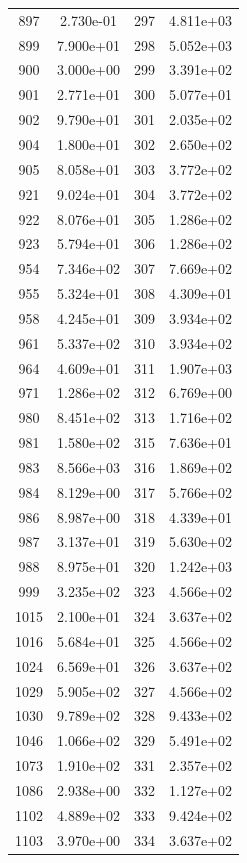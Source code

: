 \documentclass[12pt]{article}
\begin{document}
\begin{longtable}{@{}cccc@{}}
897 & 2.730e-01 & 297 & 4.811e+03 \\
899 & 7.900e+01 & 298 & 5.052e+03 \\
900 & 3.000e+00 & 299 & 3.391e+02 \\
901 & 2.771e+01 & 300 & 5.077e+01 \\
902 & 9.790e+01 & 301 & 2.035e+02 \\
904 & 1.800e+01 & 302 & 2.650e+02 \\
905 & 8.058e+01 & 303 & 3.772e+02 \\
921 & 9.024e+01 & 304 & 3.772e+02 \\
922 & 8.076e+01 & 305 & 1.286e+02 \\
923 & 5.794e+01 & 306 & 1.286e+02 \\
954 & 7.346e+02 & 307 & 7.669e+02 \\
955 & 5.324e+01 & 308 & 4.309e+01 \\
958 & 4.245e+01 & 309 & 3.934e+02 \\
961 & 5.337e+02 & 310 & 3.934e+02 \\
964 & 4.609e+01 & 311 & 1.907e+03 \\
971 & 1.286e+02 & 312 & 6.769e+00 \\
980 & 8.451e+02 & 313 & 1.716e+02 \\
981 & 1.580e+02 & 315 & 7.636e+01 \\
983 & 8.566e+03 & 316 & 1.869e+02 \\
984 & 8.129e+00 & 317 & 5.766e+02 \\
986 & 8.987e+00 & 318 & 4.339e+01 \\
987 & 3.137e+01 & 319 & 5.630e+02 \\
988 & 8.975e+01 & 320 & 1.242e+03 \\
999 & 3.235e+02 & 323 & 4.566e+02 \\
1015 & 2.100e+01 & 324 & 3.637e+02 \\
1016 & 5.684e+01 & 325 & 4.566e+02 \\
1024 & 6.569e+01 & 326 & 3.637e+02 \\
1029 & 5.905e+02 & 327 & 4.566e+02 \\
1030 & 9.789e+02 & 328 & 9.433e+02 \\
1046 & 1.066e+02 & 329 & 5.491e+02 \\
1073 & 1.910e+02 & 331 & 2.357e+02 \\
1086 & 2.938e+00 & 332 & 1.127e+02 \\
1102 & 4.889e+02 & 333 & 9.424e+02 \\
1103 & 3.970e+00 & 334 & 3.637e+02 \\

\end{longtable}
\end{document}
